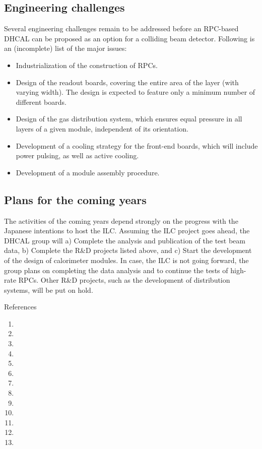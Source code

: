 \subsection{Engineering challenges}
Several engineering challenges remain to be addressed before an RPC-based DHCAL can be proposed as an option for a colliding beam detector. Following is an (incomplete) list of the major issues:
\begin{itemize}
\item Industrialization of the construction of RPCs.
\item Design of the readout boards, covering the entire area of the layer (with varying width). The design is expected to feature only a minimum number of different boards.
\item Design of the gas distribution system, which ensures equal pressure in all layers of a given module, independent of its orientation.
\item Development of a cooling strategy for the front-end boards, which will include power pulsing, as well as active cooling.
\item Development of a module assembly procedure.
\end{itemize}

\subsection{Plans for the coming years}
The activities of the coming years depend strongly on the progress with the Japanese intentions to host the ILC. Assuming the ILC project goes ahead, the DHCAL group will
a)  Complete the analysis and publication of the test beam data,
b)  Complete the R\&D projects listed above, and
c)  Start the development of the design of calorimeter modules.
In case, the ILC is not going forward, the group plans on completing the data analysis and to continue the tests of high-rate RPCs. Other R\&D projects, such as the development of distribution systems, will be put on hold.

References
\begin{enumerate}
\item {}
\item {}
\item {}
\item {}
\item {}
\item {}
\item {}
\item {}
\item {}
\item {}
\item {}
\item {}
\item {}
\end{enumerate}
